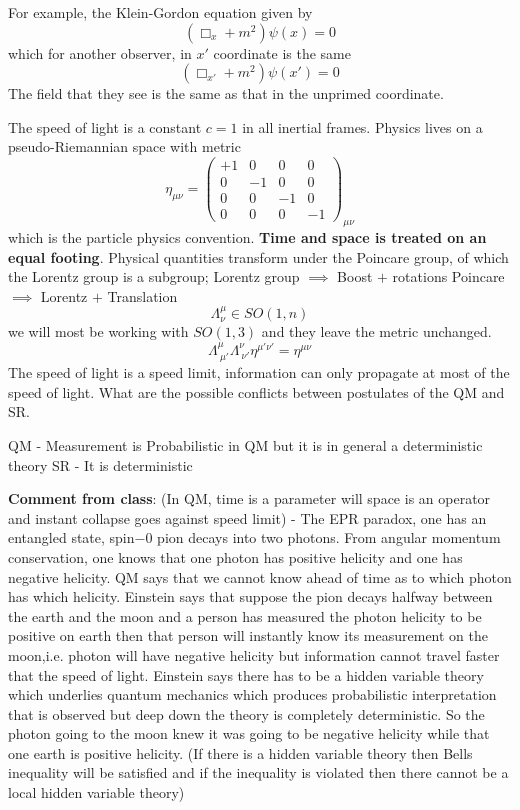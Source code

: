 For example, the Klein-Gordon equation given by 
\begin{equation}
    (\Box_x + m^2)\psi(x) = 0
\end{equation}
which for another observer, in $x'$ coordinate is the same 
\begin{equation}
    (\Box_{x'} + m^2)\psi(x') = 0
\end{equation}
The field that they see is the same as that in the unprimed coordinate. 

The speed of light is a constant  $c = 1$ in all inertial frames.  Physics lives on a pseudo-Riemannian space with metric
\begin{equation}
    \eta_{\mu \nu} = \begin{pmatrix} 
+ 1 & 0 & 0 & 0\\
 0 & -1 & 0 & 0\\
0 & 0 & -1 & 0\\
0 & 0 & 0 & -1
\end{pmatrix}_{\mu \nu}
\end{equation}
which is the particle physics convention. \textbf{Time and space is treated on an equal footing}. Physical quantities transform under the Poincare group, of which the Lorentz group is a subgroup;
Lorentz group $\implies$ Boost $+$ rotations
Poincare $\implies$ Lorentz $+$ Translation
$$\Lambda_{\nu}^{\mu} \in SO(1, n)$$we will most be working with $SO(1, 3)$ and they leave the metric unchanged. $$\Lambda_{\: \mu'}^{\mu} \Lambda_{\: \nu'}^{\nu} \eta^{\mu'\nu'} = \eta^{\mu \nu}$$
The speed of light is a speed limit, information can only propagate at most of the speed of light. What are the possible conflicts between postulates of the QM and SR. 

QM - Measurement is Probabilistic in QM but it is in general a deterministic theory
SR - It is deterministic

\textbf{Comment from class}: (In QM, time is a parameter will space is an operator and instant collapse goes against speed limit) - The EPR paradox, one has an entangled state, spin$-0$ pion decays into two photons. From angular momentum conservation, one knows that one photon has positive helicity and one has negative helicity. QM says that we cannot know ahead of time as to which photon has which helicity. Einstein says that suppose the pion decays halfway between the earth and the moon and a person has measured the photon helicity to be positive on earth then that person will instantly know its measurement on the moon,i.e. photon will have negative helicity but information cannot travel faster that the speed of light. Einstein says there has to be a hidden variable theory which underlies quantum mechanics which produces probabilistic interpretation that is observed but deep down the theory is completely deterministic. So the photon going to the moon knew it was going to be negative helicity while that one earth is positive helicity. (If there is a hidden variable theory then Bells inequality will be satisfied and if the inequality is violated then there cannot be a local hidden variable theory)


